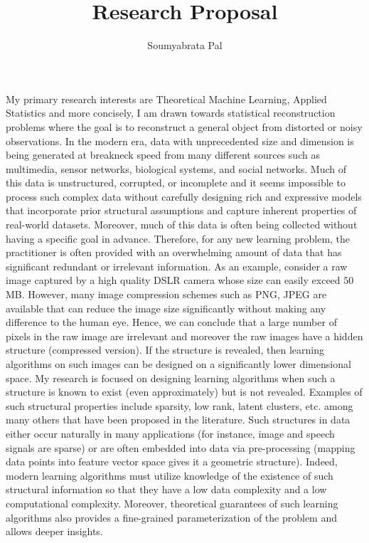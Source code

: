 \documentclass[paper=a4, fontsize=12pt]{article}
\title{	
\normalfont \normalsize 
\large Research Proposal \\ %
}
\author{Soumyabrata Pal} %
\date{\vspace{-5ex}}
\begin{document}
\maketitle 

My primary research interests are Theoretical Machine Learning, Applied Statistics and more concisely, I am drawn towards statistical reconstruction problems where the goal is to reconstruct a general object from distorted or noisy observations. In the modern era, data with unprecedented size and dimension is being generated at breakneck speed from many different sources such as multimedia, sensor networks, biological systems, and social networks. Much of this data is unstructured, corrupted, or incomplete and it seems impossible to process such complex data without carefully designing rich and expressive models that incorporate prior structural assumptions and capture inherent properties of real-world datasets.
Moreover, much of this data is often being collected without having a specific goal in advance. Therefore, for any new learning problem, the practitioner is often provided with an overwhelming amount of data that has significant redundant or irrelevant information. As an example, consider a raw image captured by a high quality DSLR camera whose size can easily exceed $50$ MB. However, many image compression schemes such as PNG, JPEG are available that can reduce the image size significantly without making any difference to the human eye. Hence, we can conclude that a large number of pixels in the raw image are irrelevant and moreover the raw images have a hidden structure (compressed version). If the structure is revealed, then learning algorithms on such images can be designed on a significantly lower dimensional space. My research is focused on designing learning algorithms when such a structure is known to exist (even approximately) but is not revealed. Examples of such structural properties 
include sparsity, low rank, latent clusters, etc. among many others that have been proposed in the literature.
Such structures in data either occur naturally in many applications (for instance, image and speech signals are sparse) or are often embedded into data via pre-processing (mapping data points into feature vector space gives it a geometric structure).
Indeed, modern learning algorithms must utilize knowledge of the existence of such structural information so that they have a low data complexity and a low computational complexity. Moreover, theoretical guarantees of such learning algorithms also provides a fine-grained parameterization of the problem and allows deeper insights. 
\end{document}
